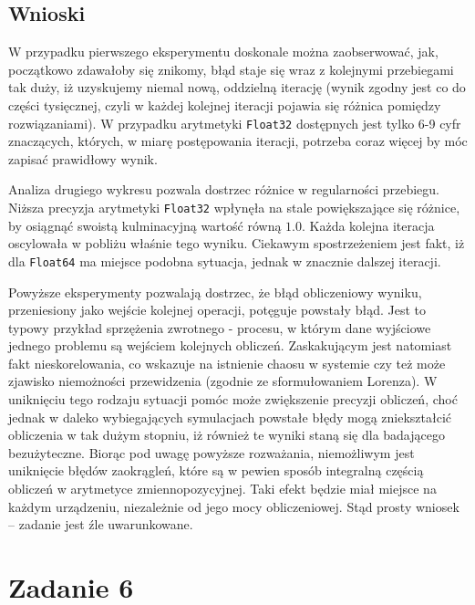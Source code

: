 \documentclass{classrep}
\begin{document}
	\subsection{Wnioski}
		W przypadku pierwszego eksperymentu doskonale można zaobserwować, jak, początkowo zdawałoby się znikomy, błąd staje się wraz z kolejnymi przebiegami tak duży, iż uzyskujemy niemal nową, oddzielną iterację (wynik zgodny jest co do części tysięcznej, czyli w każdej kolejnej iteracji pojawia się różnica pomiędzy rozwiązaniami). W przypadku arytmetyki \texttt{Float32} dostępnych jest tylko 6-9 cyfr znaczących, których, w miarę postępowania iteracji, potrzeba coraz więcej by móc zapisać prawidłowy wynik.

		Analiza drugiego wykresu pozwala dostrzec różnice w regularności przebiegu. Niższa precyzja arytmetyki \texttt{Float32} wpłynęła na stale powiększające się różnice, by osiągnąć swoistą kulminacyjną wartość równą $1.0$. Każda kolejna iteracja oscylowała w pobliżu właśnie tego wyniku.
		Ciekawym spostrzeżeniem jest fakt, iż dla \texttt{Float64} ma miejsce podobna sytuacja, jednak w znacznie dalszej iteracji. 
		
		Powyższe eksperymenty pozwalają dostrzec, że błąd obliczeniowy wyniku, przeniesiony jako wejście kolejnej operacji, potęguje powstały błąd. Jest to typowy przykład sprzężenia zwrotnego - procesu, w którym dane wyjściowe jednego problemu są wejściem kolejnych obliczeń. Zaskakującym jest natomiast fakt nieskorelowania, co wskazuje na istnienie chaosu w systemie czy też może zjawisko niemożności przewidzenia (zgodnie ze sformułowaniem Lorenza). W uniknięciu tego rodzaju sytuacji pomóc może zwiększenie precyzji obliczeń, choć jednak w daleko wybiegających symulacjach powstałe błędy mogą zniekształcić obliczenia w tak dużym stopniu, iż również te wyniki staną się dla badającego bezużyteczne. Biorąc pod uwagę powyższe rozważania, niemożliwym jest uniknięcie błędów zaokrągleń, które są w pewien sposób integralną częścią obliczeń w arytmetyce zmiennopozycyjnej. Taki efekt będzie miał miejsce na każdym urządzeniu, niezależnie od jego mocy obliczeniowej. Stąd prosty wniosek -- zadanie jest źle uwarunkowane.
		
\section{Zadanie 6}
\end{document}
